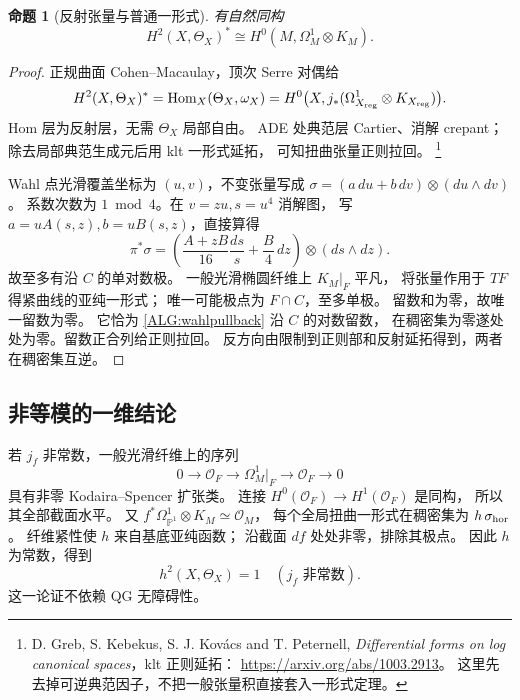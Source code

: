 \documentclass[UTF8,fontset=fandol,zihao=-4,oneside,openany]{ctexbook}
\theoremstyle{cjkplain}
\newtheorem{proposition}[theorem]{命题}
\numberwithin{equation}{chapter}
\begin{document}
\begin{proposition}[反射张量与普通一形式]
\label{ALG:duality}
有自然同构
\begin{equation}
H^2(X,\Theta_X)^*\cong H^0(M,\Omega_M^1\otimes K_M).
\label{ALG:dualityeq}
\end{equation}
\end{proposition}
\begin{proof}
正规曲面 Cohen--Macaulay，顶次 Serre 对偶给
\[
H^2(X,\Theta_X)^*
=\operatorname{Hom}_X(\Theta_X,\omega_X)
=H^0\bigl(X,j_*(\Omega^1_{X_{\rm reg}}\otimes K_{X_{\rm reg}})\bigr).
\]
Hom 层为反射层，无需 $\Theta_X$ 局部自由。
ADE 处典范层 Cartier、消解 crepant；
除去局部典范生成元后用 klt 一形式延拓，
可知扭曲张量正则拉回。
\footnote{D. Greb, S. Kebekus, S. J. Kovács and T. Peternell,
\emph{Differential forms on log canonical spaces}，klt 正则延拓：
\url{https://arxiv.org/abs/1003.2913}。
这里先去掉可逆典范因子，不把一般张量积直接套入一形式定理。}

Wahl 点光滑覆盖坐标为 $(u,v)$，不变张量写成
$\sigma=(a\,du+b\,dv)\otimes(du\wedge dv)$。
系数次数为 $1\bmod4$。在 $v=zu,s=u^4$ 消解图，
写 $a=uA(s,z),b=uB(s,z)$，直接算得
\begin{equation}
\pi^*\sigma=
\left(\frac{A+zB}{16}\frac{ds}{s}
+\frac B4\,dz\right)\otimes(ds\wedge dz).
\label{ALG:wahlpullback}
\end{equation}
故至多有沿 $C$ 的单对数极。
一般光滑椭圆纤维上 $K_M|_F$ 平凡，
将张量作用于 $TF$ 得紧曲线的亚纯一形式；
唯一可能极点为 $F\cap C$，至多单极。
留数和为零，故唯一留数为零。
它恰为 \eqref{ALG:wahlpullback} 沿 $C$ 的对数留数，
在稠密集为零遂处处为零。留数正合列给正则拉回。
反方向由限制到正则部和反射延拓得到，两者在稠密集互逆。
\end{proof}

\subsection{非等模的一维结论}

若 $j_f$ 非常数，一般光滑纤维上的序列
\[
0\to\mathcal O_F\to\Omega_M^1|_F\to\mathcal O_F\to0
\]
具有非零 Kodaira--Spencer 扩张类。
连接 $H^0(\mathcal O_F)\to H^1(\mathcal O_F)$ 是同构，
所以其全部截面水平。
又
$f^*\Omega_{\mathbb P^1}^1\otimes K_M\simeq\mathcal O_M$，
每个全局扭曲一形式在稠密集为 $h\,\sigma_{\rm hor}$。
纤维紧性使 $h$ 来自基底亚纯函数；
沿截面 $df$ 处处非零，排除其极点。
因此 $h$ 为常数，得到
\begin{equation}
h^2(X,\Theta_X)=1\quad(j_f\text{ 非常数}).
\label{ALG:noniso}
\end{equation}
这一论证不依赖 QG 无障碍性。
\end{document}
